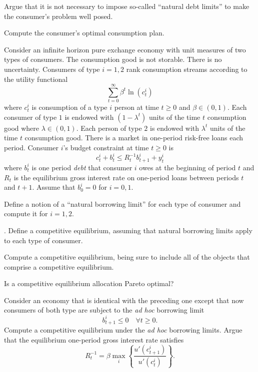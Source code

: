 \medskip
{} Argue that it is not necessary to impose so-called ``natural debt limits'' to make the consumer's
problem well posed.

\medskip
{} Compute the consumer's optimal consumption plan.                                   


                                


\medskip

 
\medskip

\noindent 
Consider an infinite horizon pure exchange economy with unit measures of two types of consumers. The consumption good is not storable.  There is no uncertainty.
Consumers of type  $i=1,2$ rank consumption streams according to the utility functional
$$ \sum_{t=0}^\infty \beta^t \ln (c^i_t) $$
where $c_t^i$ is consumption of a type $i$ person at time $t \geq 0$ and $\beta \in (0,1)$. 
Each consumer of type $1$ is endowed with $(1-\lambda^t)$ units of the time $t$ consumption good where
$\lambda \in (0,1)$. Each person of type $2$ is endowed with $\lambda^t$ units of the time $t$ consumption good. 
There is a market in one-period risk-free loans each period.  Consumer $i$'s budget constraint at time $t \geq 0$ is
$$ c_t^i + b_t^i \leq R_t^{-1} b^i_{t+1} + y_t^i $$
where $b_t^i$ is one period {\it debt} that consumer $i$ owes at the beginning of period $t$ and $R_t$ is the 
equilibrium gross interest rate on one-period loans between periods $t$ and $t+1$.  Assume that $b_0^i=0$ for
$i=0,1$.

\medskip

 Define a notion of a ``natural borrowing limit'' for each type of consumer and compute it
for $i =1,2$.

\medskip
{}. Define a competitive equilibrium, assuming that natural borrowing limits apply to each type of consumer.  

\medskip
{} Compute a competitive equilibrium, being sure to include all of the objects that comprise a competitive
equilibrium.

\medskip
{} Is a competitive equilibrium allocation Pareto optimal?

\medskip
{} Consider an economy that is identical with the preceding one except that now 
consumers of both type are subject to the {\it ad hoc\/} borrowing limit
$$ b^i_{t+1} \leq 0 \quad \forall t \geq 0 .$$   Compute a competitive equilibrium under the {\it ad hoc\/} borrowing
limits.  Argue that the equilibrium one-period gross interest rate satisfies
$$ R_t^{-1} = \beta \max_i \left\{ {\frac{u'(c^i_{t+1})}{u'(c^i_t)}}   \right\} .$$

